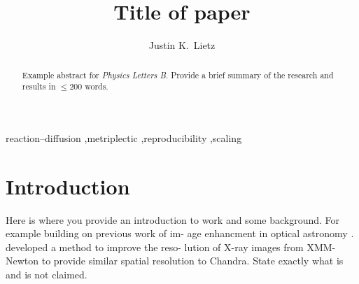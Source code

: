 \documentclass[final,5p,times,authoryear]{elsarticle}
\begin{document}

\begin{frontmatter}

\title{Title of paper}

\author[neu]{Justin K.\ Lietz}
\address[neu]{Neuroca, Inc.}

\begin{abstract}
Example abstract for \textit{Physics Letters B}. Provide a brief summary of the research
and results in $\le$200 words.
\end{abstract}

\begin{keyword}
reaction–diffusion \sep metriplectic \sep reproducibility \sep scaling
\end{keyword}

\end{frontmatter}

\section{Introduction}
Here is where you provide an introduction to work and some
background. For example building on previous work of im-
age enhancment in optical astronomy \citep{Fortunato2010}. \citet{Vehlowetal2013} developed a method to improve the reso-
lution of X-ray images from XMM-Newton to provide similar
spatial resolution to Chandra. State exactly what is and is not claimed.

\end{document}
